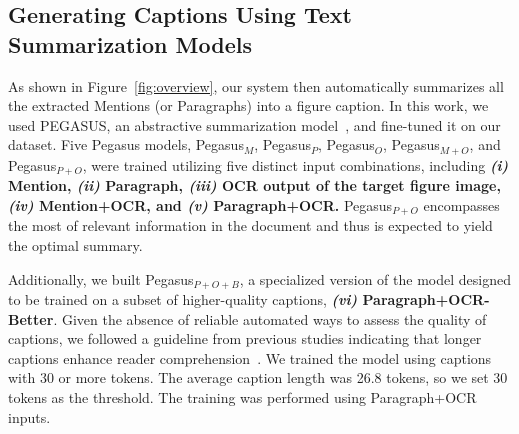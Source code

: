 

\subsection{Generating Captions Using Text Summarization Models}
As shown in Figure~\ref{fig:overview}, our system then automatically summarizes all the extracted Mentions (or Paragraphs) into a figure caption.
In this work, we used PEGASUS, an abstractive summarization model~\cite{zhang2020pegasus}, and fine-tuned it on our dataset.
Five Pegasus models, Pegasus$_{M}$, Pegasus$_{P}$, Pegasus$_{O}$, Pegasus$_{M+O}$, and Pegasus$_{P+O}$, were trained utilizing five distinct input combinations, including
\textbf{
{\em (i)} Mention, 
{\em (ii)} Paragraph, 
{\em (iii)} OCR output of the target figure image, 
{\em (iv)} Mention+OCR, and 
{\em (v)} Paragraph+OCR.}
Pegasus$_{P+O}$ encompasses the most of relevant information in the document and thus is expected to yield the optimal summary.

Additionally, we built Pegasus$_{P+O+B}$, a specialized version of the model designed to be trained on a subset of higher-quality captions, \textbf{{\em (vi)} Paragraph+OCR-Better}.
Given the absence of reliable automated ways to assess the quality of captions, we followed a guideline from previous studies indicating that longer captions enhance reader comprehension~\cite{hartley2003single,gelman2002let}.
We trained the model using captions with 30 or more tokens.
The average caption length was 26.8 tokens, so we set 30 tokens as the threshold.
The training was performed using Paragraph+OCR inputs.





